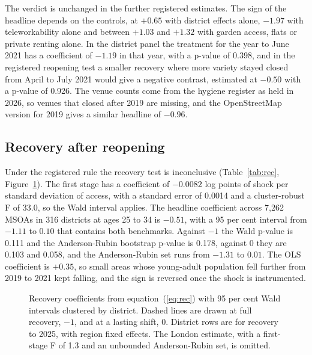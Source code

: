 \documentclass[11pt,a4paper]{article}
\begin{document}
The verdict is unchanged in the further registered estimates. The sign of the headline depends on the controls, at $+0.65$ with district effects alone, $-1.97$ with teleworkability alone and between $+1.03$ and $+1.32$ with garden access, flats or private renting alone. In the district panel the treatment for the year to June 2021 has a coefficient of $-1.19$ in that year, with a p-value of 0.398, and in the registered reopening test a smaller recovery where more variety stayed closed from April to July 2021 would give a negative contrast, estimated at $-0.50$ with a p-value of 0.926. The venue counts come from the hygiene register as held in 2026, so venues that closed after 2019 are missing, and the OpenStreetMap version for 2019 gives a similar headline of $-0.96$.

\subsection{Recovery after reopening}\label{sec:recovery}

Under the registered rule the recovery test is inconclusive (Table~\ref{tab:rec}, Figure~\ref{fig:rec}). The first stage has a coefficient of $-0.0082$ log points of shock per standard deviation of access, with a standard error of 0.0014 and a cluster-robust F of 33.0, so the Wald interval applies. The headline coefficient across 7,262 MSOAs in 316 districts at ages 25 to 34 is $-0.51$, with a 95 per cent interval from $-1.11$ to $0.10$ that contains both benchmarks. Against $-1$ the Wald p-value is 0.111 and the Anderson-Rubin bootstrap p-value is 0.178, against 0 they are 0.103 and 0.058, and the Anderson-Rubin set runs from $-1.31$ to $0.01$. The OLS coefficient is $+0.35$, so small areas whose young-adult population fell further from 2019 to 2021 kept falling, and the sign is reversed once the shock is instrumented.

\begin{figure}[htbp]
\centering
{}
\caption{Recovery coefficients from equation~(\ref{eq:rec}) with 95 per cent Wald intervals clustered by district. Dashed lines are drawn at full recovery, $-1$, and at a lasting shift, 0. District rows are for recovery to 2025, with region fixed effects. The London estimate, with a first-stage F of 1.3 and an unbounded Anderson-Rubin set, is omitted.}\label{fig:rec}
\end{figure}
\end{document}
